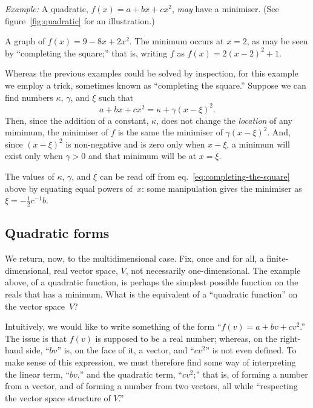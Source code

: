\documentclass[10pt, a4paper]{article}
\newcommand{\eg}{\emph{Example:}}
\begin{document}
\eg{} A quadratic, $f(x) = a + bx + cx^2$, \emph{may} have a
minimiser. (See figure~\ref{fig:quadratic} for an illustration.)
\begin{marginfigure}
  \begin{center}
  \end{center}
  \caption{A graph of $f(x) = 9 - 8x + 2x^2$. The minimum occurs at
    $x=2$, as may be seen by “completing the square;” that is, writing
    $f$ as $f(x) = 2{(x-2)}^2+1$.\label{fig:quadratic}}
\end{marginfigure}
Whereas the previous examples could be solved by inspection, for this
example we employ a trick, sometimes known as “completing the square.”
Suppose we can find numbers $\kappa$, $\gamma$, and $\xi$ such that
\begin{equation}
  a + bx + cx^2 = \kappa + \gamma{(x - \xi)}^2.
\label{eq:completing-the-square}
\end{equation}
Then, since the addition of a constant, $\kappa$, does not change the
\emph{location} of any mimimum, the minimiser of $f$ is the same the
minimiser of $\gamma{(x-\xi)}^2$. And, since ${(x-\xi)}^2$ is non-negative and
is zero only when $x-\xi$, a minimum will exist only when $\gamma >0$ and
that minimum will be at $x=\xi$.

The values of $\kappa$, $\gamma$, and $\xi$ can be read off from
eq.~\eqref{eq:completing-the-square} above by equating equal powers
of~$x$: some manipulation gives the minimiser as
$\xi=-\frac{1}{2}c^{-1}b$.

\subsection*{Quadratic forms}
We return, now, to the multidimensional case. Fix, once and for all, a
finite-dimensional, real vector space, $V$, not necessarily
one-dimensional. The example above, of a quadratic function, is
perhaps the simplest possible function on the reals that has a
minimum. What is the equivalent of a ``quadratic function'' on the
vector space~$V$?

Intuitively, we would like to write something of the form
``$f(v) = a+bv+cv^2$.'' The issue is that $f(v)$ is supposed to be a
real number; whereas, on the right-hand side, ``$bv$'' is, on the face
of it, a vector, and ``$cv^2$'' is not even defined. To make sense of
this expression, we must therefore find some way of interpreting the
linear term, ``$bv$,'' and the quadratic term, ``$cv^2$;'' that is, of
forming a number from a vector, and of forming a number from two
vectors, all while “respecting the vector space structure of $V$.”
\end{document}
